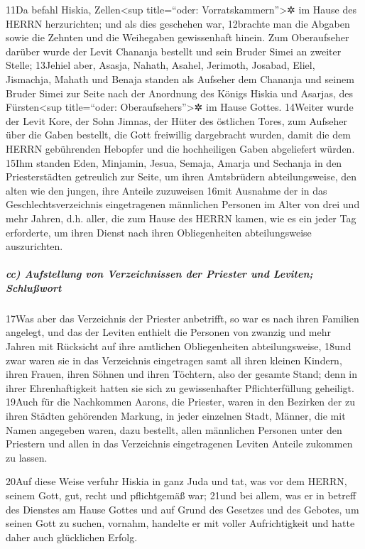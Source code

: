 11Da befahl Hiskia, Zellen\textless sup title=``oder:
Vorratskammern''\textgreater✲ im Hause des HERRN herzurichten; und als
dies geschehen war, 12brachte man die Abgaben sowie die Zehnten und die
Weihegaben gewissenhaft hinein. Zum Oberaufseher darüber wurde der Levit
Chananja bestellt und sein Bruder Simei an zweiter Stelle; 13Jehiel
aber, Asasja, Nahath, Asahel, Jerimoth, Josabad, Eliel, Jismachja,
Mahath und Benaja standen als Aufseher dem Chananja und seinem Bruder
Simei zur Seite nach der Anordnung des Königs Hiskia und Asarjas, des
Fürsten\textless sup title=``oder: Oberaufsehers''\textgreater✲ im Hause
Gottes. 14Weiter wurde der Levit Kore, der Sohn Jimnas, der Hüter des
östlichen Tores, zum Aufseher über die Gaben bestellt, die Gott
freiwillig dargebracht wurden, damit die dem HERRN gebührenden Hebopfer
und die hochheiligen Gaben abgeliefert würden. 15Ihm standen Eden,
Minjamin, Jesua, Semaja, Amarja und Sechanja in den Priesterstädten
getreulich zur Seite, um ihren Amtsbrüdern abteilungsweise, den alten
wie den jungen, ihre Anteile zuzuweisen 16mit Ausnahme der in das
Geschlechtsverzeichnis eingetragenen männlichen Personen im Alter von
drei und mehr Jahren, d.h. aller, die zum Hause des HERRN kamen, wie es
ein jeder Tag erforderte, um ihren Dienst nach ihren Obliegenheiten
abteilungsweise auszurichten.

\hypertarget{cc-aufstellung-von-verzeichnissen-der-priester-und-leviten-schluuxdfwort}{%
\subparagraph{cc) Aufstellung von Verzeichnissen der Priester und
Leviten;
Schlußwort}\label{cc-aufstellung-von-verzeichnissen-der-priester-und-leviten-schluuxdfwort}}

17Was aber das Verzeichnis der Priester anbetrifft, so war es nach ihren
Familien angelegt, und das der Leviten enthielt die Personen von zwanzig
und mehr Jahren mit Rücksicht auf ihre amtlichen Obliegenheiten
abteilungsweise, 18und zwar waren sie in das Verzeichnis eingetragen
samt all ihren kleinen Kindern, ihren Frauen, ihren Söhnen und ihren
Töchtern, also der gesamte Stand; denn in ihrer Ehrenhaftigkeit hatten
sie sich zu gewissenhafter Pflichterfüllung geheiligt. 19Auch für die
Nachkommen Aarons, die Priester, waren in den Bezirken der zu ihren
Städten gehörenden Markung, in jeder einzelnen Stadt, Männer, die mit
Namen angegeben waren, dazu bestellt, allen männlichen Personen unter
den Priestern und allen in das Verzeichnis eingetragenen Leviten Anteile
zukommen zu lassen.

20Auf diese Weise verfuhr Hiskia in ganz Juda und tat, was vor dem
HERRN, seinem Gott, gut, recht und pflichtgemäß war; 21und bei allem,
was er in betreff des Dienstes am Hause Gottes und auf Grund des
Gesetzes und des Gebotes, um seinen Gott zu suchen, vornahm, handelte er
mit voller Aufrichtigkeit und hatte daher auch glücklichen Erfolg.

